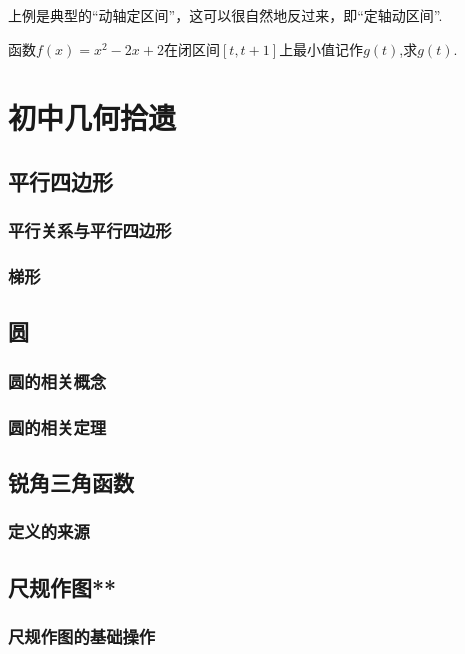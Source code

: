 上例是典型的“动轴定区间”，这可以很自然地反过来，即“定轴动区间”.

\begin{example}
    函数$f(x)=x^2-2x+2$在闭区间$[t,t+1]$上最小值记作$g(t)$,求$g(t)$.
\end{example}
\begin{jie}
    
\end{jie}

\chapter{初中几何拾遗}
\section{平行四边形}
\subsection{平行关系与平行四边形}
\subsection{梯形}
\clearpage
\section{圆}
\subsection{圆的相关概念}
\clearpage
\subsection{圆的相关定理}
\section{锐角三角函数}
\subsection{定义的来源}
\clearpage
\section{尺规作图**}
\subsection{尺规作图的基础操作}
\clearpage